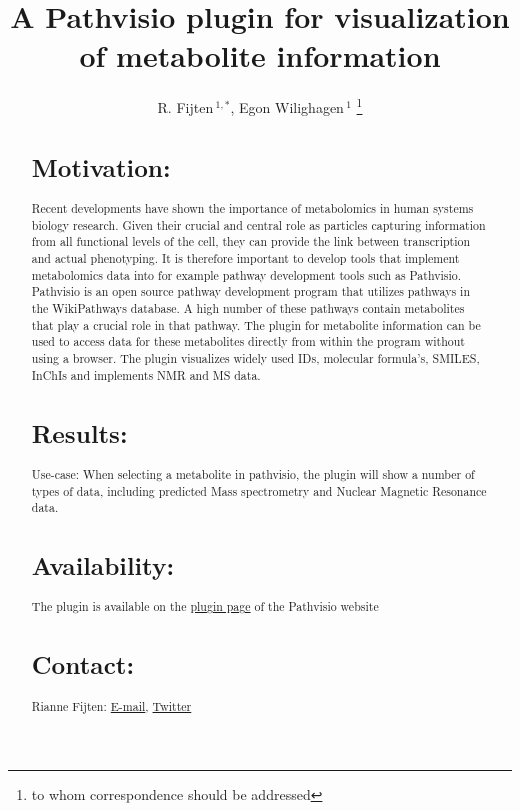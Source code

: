 \documentclass{bioinfo}
\begin{document}

\title[short Title]{A Pathvisio plugin for visualization of metabolite information}
\author[Sample \textit{et~al}]{R. Fijten\,$^{1,*}$, Egon Wilighagen\,$^{1}$ \footnote{to whom correspondence should be addressed}}
\address{$^{1}$Department of Bioinformatics, Maastricht University, Address XXXX}



\maketitle

\begin{abstract}

\section{Motivation:}
Recent developments have shown the importance of metabolomics in human systems biology research.  Given their crucial and central role as particles capturing information from all functional levels of the cell, they can provide the link between transcription and actual phenotyping. It is therefore important to develop tools that implement metabolomics data into for example pathway development tools such as Pathvisio. Pathvisio is an open source pathway development program that utilizes pathways in the WikiPathways database. A high number of these pathways contain metabolites that play a crucial role in that pathway. The plugin for metabolite information can be used to access data for these metabolites directly from within the program without using a browser. The plugin visualizes widely used IDs, molecular formula's, SMILES, InChIs and implements NMR and MS data. 

\section{Results:}
Use-case: When selecting a metabolite in pathvisio, the plugin will show a number of types of data, including predicted Mass spectrometry and Nuclear Magnetic Resonance data.

\section{Availability:}
The plugin is available on the  \href{http://pathvisio.org/wiki/PluginDocumentation}{plugin page} of the Pathvisio website
\section{Contact:} Rianne Fijten: \href{riannefijten@gmail.com}{E-mail}, \href{https://twitter.com/riannefijten}{Twitter}
\end{abstract}
\end{document}

